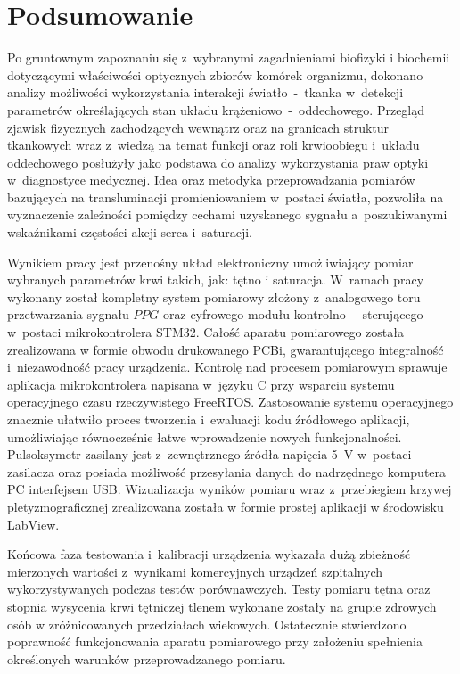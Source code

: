 \renewcommand{\figurename}{Rys.}

\chapter{Podsumowanie}
\label{cha:podsumowanie}

Po gruntownym zapoznaniu się z~wybranymi zagadnieniami biofizyki i biochemii dotyczącymi właściwości optycznych zbiorów komórek organizmu, dokonano 
analizy możliwości wykorzystania interakcji światło~-~tkanka w~detekcji parametrów określających stan układu krążeniowo~-~oddechowego. 
Przegląd zjawisk fizycznych zachodzących wewnątrz oraz na granicach struktur tkankowych wraz z~wiedzą na temat funkcji oraz roli krwioobiegu 
i~układu oddechowego posłużyły jako podstawa do analizy wykorzystania praw optyki w~diagnostyce medycznej. Idea oraz metodyka przeprowadzania 
pomiarów bazujących na transluminacji promieniowaniem w~postaci światła, pozwoliła na wyznaczenie zależności pomiędzy cechami uzyskanego 
sygnału a~poszukiwanymi wskaźnikami częstości akcji serca i~saturacji. 

Wynikiem pracy jest przenośny układ elektroniczny umożliwiający pomiar wybranych parametrów krwi takich, jak: tętno i saturacja. W~ramach pracy 
wykonany został kompletny system pomiarowy złożony z~analogowego toru przetwarzania sygnału $PPG$ oraz cyfrowego modułu kontrolno~-~sterującego 
w~postaci mikrokontrolera STM32. Całość aparatu pomiarowego została zrealizowana w formie obwodu drukowanego PCBi, gwarantującego integralność 
i~niezawodność pracy urządzenia. Kontrolę nad procesem pomiarowym sprawuje aplikacja mikrokontrolera napisana w~języku C przy wsparciu systemu 
operacyjnego czasu rzeczywistego FreeRTOS. Zastosowanie systemu operacyjnego znacznie ułatwiło proces tworzenia i~ewaluacji kodu źródłowego aplikacji, 
umożliwiając równocześnie łatwe wprowadzenie nowych funkcjonalności. Pulsoksymetr zasilany jest z~zewnętrznego źródła napięcia 5~V w~postaci zasilacza oraz
posiada możliwość przesyłania danych do nadrzędnego komputera PC interfejsem USB. Wizualizacja wyników pomiaru wraz z~przebiegiem krzywej
pletyzmograficznej zrealizowana została w formie prostej aplikacji w środowisku LabView.

Końcowa faza testowania i~kalibracji urządzenia wykazała dużą zbieżność mierzonych wartości z~wynikami komercyjnych urządzeń szpitalnych wykorzystywanych
podczas testów porównawczych. Testy pomiaru tętna oraz stopnia wysycenia krwi tętniczej tlenem wykonane zostały na grupie zdrowych osób 
w zróżnicowanych przedziałach wiekowych. Ostatecznie stwierdzono poprawność funkcjonowania aparatu pomiarowego przy założeniu spełnienia
określonych warunków przeprowadzanego pomiaru. 


